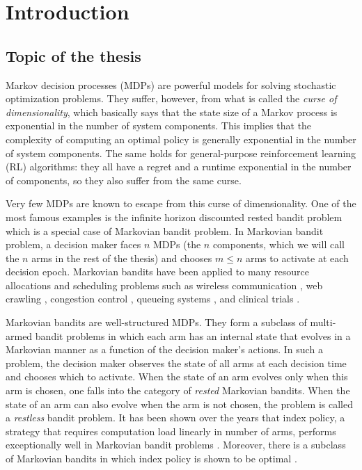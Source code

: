\begingroup
\let\clearpage\relax

\chapter{Introduction}
\label{chapter:introduction}

\section{Topic of the thesis}

Markov decision processes (MDPs) are powerful models for solving stochastic optimization problems. They suffer, however, from what is called the \emph{curse of dimensionality}, which basically says that the state size of a Markov process is exponential in the number of system components. This implies that the complexity of computing an optimal policy is generally exponential in the number of system components. The same holds for general-purpose reinforcement learning (RL) algorithms: they all have a regret and a runtime exponential in the number of components, so they also suffer from the same curse.

Very few MDPs are known to escape from this curse of dimensionality.
One of the most famous examples is the infinite horizon discounted rested bandit problem which is a special case of Markovian bandit problem.
In Markovian bandit problem, a decision maker faces $n$ MDPs (the $n$ components, which we will call the $n$ arms in the rest of the thesis) and chooses $m\le n$ arms to activate at each decision epoch.
Markovian bandits have been applied to many resource allocations and scheduling problems such as wireless communication \cite{raghunathan2008index, liu2010indexability, aalto2019whittle}, web crawling \cite{nino2014dynamic, avrachenkov2022whittle}, congestion control \cite{avrachenkov2013congestion, avrachenkov2018impulsive}, queueing systems \cite{glazebrook2009index, aalto2009gittins, archibald2009indexability, aalto2011properties, larranaga2015asymptotically, borkar2017whittle, scully2018soap}, and clinical trials \cite{villar2015multi}.

Markovian bandits are well-structured MDPs.
They form a subclass of multi-armed bandit problems in which each arm has an internal state that evolves in a Markovian manner as a function of the decision maker’s actions.
In such a problem, the decision maker observes the state of all arms at each decision time and chooses which to activate.
When the state of an arm evolves only when this arm is chosen, one falls into the category of \emph{rested} Markovian bandits.
When the state of an arm can also evolve when the arm is not chosen, the problem is called a \emph{restless} bandit problem.
It has been shown over the years that index policy, a strategy that requires computation load linearly in number of arms, performs exceptionally well in Markovian bandit problems \cite{glazebrook2002index, ansell2003whittle, glazebrook2006some, avrachenkov2013congestion, akbarzadeh2019restless}.
Moreover, there is a subclass of Markovian bandits in which index policy is shown to be optimal \cite{gittins1979bandit}.


